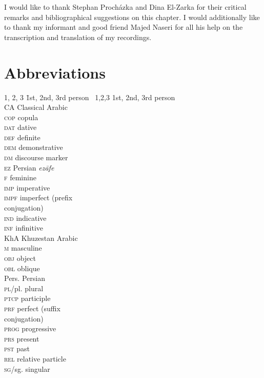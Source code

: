 \documentclass[output=paper,nonflat]{langsci/langscibook}
\begin{document}
I would like to thank Stephan Procházka and Dina El-Zarka for their critical remarks and bibliographical suggestions on this chapter. I would additionally like to thank my informant and good friend Majed Naseri for all his help on the transcription and translation of my recordings.

\section*{Abbreviations}

\begin{multicols}{3}
\begin{tabbing}
\textsc{1, 2, 3} \= 1st, 2nd, 3rd person~\kill
\textsc{1,2,3} \> 1st, 2nd, 3rd person \\
CA \> Classical Arabic\\
\textsc{cop} \> {copula}\\
\textsc{dat} \> dative\\
\textsc{def} \> {definite}\\
\textsc{dem} \> demonstrative\\
\textsc{dm} \> discourse marker\\
\textsc{ez} \> Persian \textit{ezāfe}\\
\textsc{f} \> feminine\\
\textsc{imp} \> imperative\\
\textsc{impf} \> imperfect  (prefix \\ \> conjugation)\\
\textsc{ind} \> indicative\\
\textsc{inf} \> {infinitive}\\
KhA \> Khuzestan Arabic\\
\textsc{m} \> masculine\\
\textsc{obj} \> object\\
\textsc{obl} \> oblique\\
Pers. \> Persian\\
\textsc{pl}/pl. \> plural\\
\textsc{ptcp} \> {participle}\\
\textsc{prf} \> perfect (suffix \\ \> conjugation)\\
\textsc{prog} \> progressive\\
\textsc{prs} \> present\\
\textsc{pst} \> past\\
\textsc{rel} \> {relative} particle\\
\textsc{sg}/sg. \> singular\\
\end{tabbing}%
\end{multicols}




\sloppy\printbibliography[heading=subbibliography,notkeyword=this]
\end{document}
